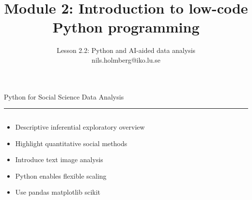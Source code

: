 \documentclass[aspectratio=169]{beamer}
\title{Module 2: Introduction to low-code Python programming}
\subtitle{Lesson 2.2: Python and AI-aided data analysis \\[0.8em]nils.holmberg@iko.lu.se}
\author{}
\newcommand{\TitleFont}{\rmfamily}
\begin{document}
\begin{frame}[plain]
  \titlepage
\end{frame}
\setcounter{framenumber}{0} %

\begin{frame}[t]{}
  \vspace*{0.5cm}
  {\TitleFont\fontsize{18}{22}\selectfont\color{LUBronze}Python for Social Science Data Analysis\par}
  \vspace{0.3em}
  {\color{LUBronze}\rule{\linewidth}{0.8pt}}\par
  \vspace{0.2cm}
  \begin{columns}[t]
    \begin{column}[t]{0.4\textwidth}
      \vspace*{0pt}
      \begin{itemize}\setlength\itemsep{0.65em}
        \item Descriptive inferential exploratory overview
        \item Highlight quantitative social methods
        \item Introduce text image analysis
        \item Python enables flexible scaling
        \item Use pandas matplotlib scikit
      \end{itemize}
    \end{column}
  \end{columns}
\end{frame}
\end{document}
